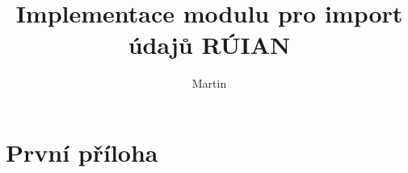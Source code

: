 \documentclass[czech, kiv, ba, he, iso690numb, pdf]{fasthesis}
\title{Implementace modulu pro import údajů RÚIAN}
\author{Martin}{Schön}{}{}
\begin{document}
\frontpages[tm]
\tableofcontents












 
\appendix
\chapter{První příloha}
\backmatter
\printbibliography
\setbackpageqrcode
\backpage
\end{document}
